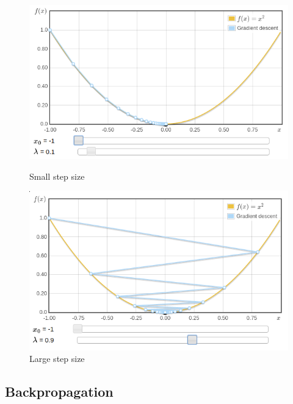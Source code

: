 \documentclass{scrartcl}
\begin{document}
\begin{figure}[ht!]
	\centering
	\begin{minipage}[b]{0.4\textwidth}
		\includegraphics[width=\textwidth]{figures/sgd_small_step_size.png}
		\caption{Small step size}
	\end{minipage}
	\hfill
	\begin{minipage}[b]{0.4\textwidth}
		\includegraphics[width=\textwidth]{figures/sgd_large_step_size.png}
		\caption{Large step size}
	\end{minipage}
\end{figure}

\subsection{Backpropagation}
\end{document}
